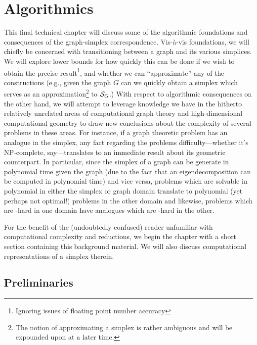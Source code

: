 \chapter{Algorithmics}
\label{chap:algorithmics}


This final technical chapter will discuss some of the algorithmic foundations and consequences of the graph-simplex correspondence. Vis-\`{a}-vis foundations, we will chiefly be concerned with transitioning between a graph and its various simplices. We will explore lower bounds for how quickly this can be done if we wish to obtain the precise result\footnote{Ignoring issues of floating point number accuracy}, and whether we can ``approximate'' any of the constructions (e.g., given the graph $G$ can we quickly obtain a simplex which serves as an approximation\footnote{The notion of approximating a simplex is rather ambiguous and will be expounded upon at a later time.} to $\mathcal{S}_G$.) With respect to algorithmic consequences on the other hand, we will attempt to leverage knowledge we have in the hitherto relatively unrelated areas of computational graph theory and high-dimensional computational geometry to draw new conclusions about the complexity of several problems in these areas. For instance, if a  graph theoretic problem has an analogue in the simplex, any fact regarding the problems difficulty---whether it's NP-complete, say---translates to an immediate result about its geometric counterpart. In particular, since the simplex of a graph can be generate in polynomial time given the graph (due to the fact that an eigendecomposition can be computed in polynomial time) and vice versa, problems which are solvable in polynomial in either the simplex or graph domain  translate to polynomial (yet perhaps not optimal!) problems in the other domain and likewise, problems which are \NP-hard in one domain have analogues which are \NP-hard in the other. 

For the benefit of the (undoubtedly confused) reader unfamiliar with computational complexity and reductions, we begin the chapter with a short section containing this background material. We will also discuss computational representations of a simplex therein. 

\section{Preliminaries}
\label{sec:algorithmics_prelims}
